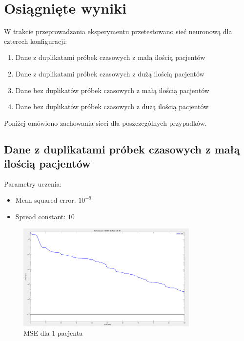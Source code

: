 \documentclass[12pt]{article}
\begin{document}
\section{Osiągnięte wyniki}
W trakcie przeprowadzania eksperymentu przetestowano sieć neuronową dla czterech konfiguracji:

\begin{enumerate}
\item Dane z duplikatami próbek czasowych z małą ilością pacjentów
\item Dane z duplikatami próbek czasowych z dużą ilością pacjentów
\item Dane bez duplikatów próbek czasowych z małą ilością pacjentów
\item Dane bez duplikatów próbek czasowych z dużą ilością pacjentów
\end{enumerate}

Poniżej omówiono zachowania sieci dla poszczególnych przypadków.

\subsection{Dane z duplikatami próbek czasowych z małą ilością pacjentów}

Parametry uczenia:
\begin{itemize}
\item Mean squared error: $10^{-9}$
\item Spread constant: $10$
\end{itemize}

\begin{figure}[h!]

\centering
\includegraphics[width=0.8\textwidth]{mse-normal-1.png}
\caption{MSE dla 1 pacjenta}

\end{figure}
\end{document}
